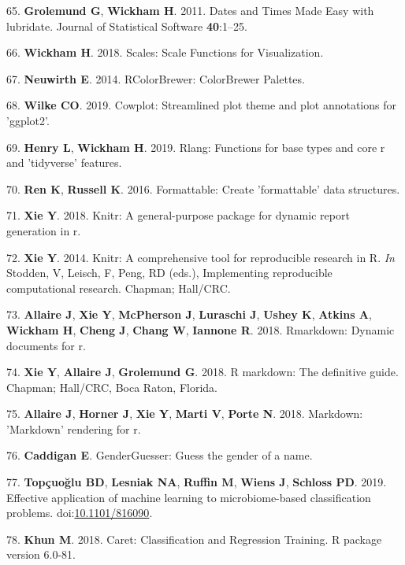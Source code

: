 \documentclass[11pt,]{article}
\begin{document}
\hypertarget{ref-grolemund_dates_2011}{}
65. \textbf{Grolemund G}, \textbf{Wickham H}. 2011. Dates and Times Made
Easy with lubridate. Journal of Statistical Software \textbf{40}:1--25.

\hypertarget{ref-wickham_scales_2018}{}
66. \textbf{Wickham H}. 2018. Scales: Scale Functions for Visualization.

\hypertarget{ref-neuwirth_rcolorbrewer_2014}{}
67. \textbf{Neuwirth E}. 2014. RColorBrewer: ColorBrewer Palettes.

\hypertarget{ref-cowplot}{}
68. \textbf{Wilke CO}. 2019. Cowplot: Streamlined plot theme and plot
annotations for 'ggplot2'.

\hypertarget{ref-rlang}{}
69. \textbf{Henry L}, \textbf{Wickham H}. 2019. Rlang: Functions for
base types and core r and 'tidyverse' features.

\hypertarget{ref-formattable}{}
70. \textbf{Ren K}, \textbf{Russell K}. 2016. Formattable: Create
'formattable' data structures.

\hypertarget{ref-knitr_2018}{}
71. \textbf{Xie Y}. 2018. Knitr: A general-purpose package for dynamic
report generation in r.

\hypertarget{ref-knitr_2014}{}
72. \textbf{Xie Y}. 2014. Knitr: A comprehensive tool for reproducible
research in R. \emph{In} Stodden, V, Leisch, F, Peng, RD (eds.),
Implementing reproducible computational research. Chapman; Hall/CRC.

\hypertarget{ref-rmd_rstudio}{}
73. \textbf{Allaire J}, \textbf{Xie Y}, \textbf{McPherson J},
\textbf{Luraschi J}, \textbf{Ushey K}, \textbf{Atkins A},
\textbf{Wickham H}, \textbf{Cheng J}, \textbf{Chang W}, \textbf{Iannone
R}. 2018. Rmarkdown: Dynamic documents for r.

\hypertarget{ref-rmd_book}{}
74. \textbf{Xie Y}, \textbf{Allaire J}, \textbf{Grolemund G}. 2018. R
markdown: The definitive guide. Chapman; Hall/CRC, Boca Raton, Florida.

\hypertarget{ref-markdown}{}
75. \textbf{Allaire J}, \textbf{Horner J}, \textbf{Xie Y}, \textbf{Marti
V}, \textbf{Porte N}. 2018. Markdown: 'Markdown' rendering for r.

\hypertarget{ref-caddigan_genderguesser}{}
76. \textbf{Caddigan E}. GenderGuesser: Guess the gender of a name.

\hypertarget{ref-Topuolu2019}{}
77. \textbf{Topçuoğlu BD}, \textbf{Lesniak NA}, \textbf{Ruffin M},
\textbf{Wiens J}, \textbf{Schloss PD}. 2019. Effective application of
machine learning to microbiome-based classification problems.
doi:\href{https://doi.org/10.1101/816090}{10.1101/816090}.

\hypertarget{ref-khun_caret_2018}{}
78. \textbf{Khun M}. 2018. Caret: Classification and Regression
Training. R package version 6.0-81.
\end{document}
